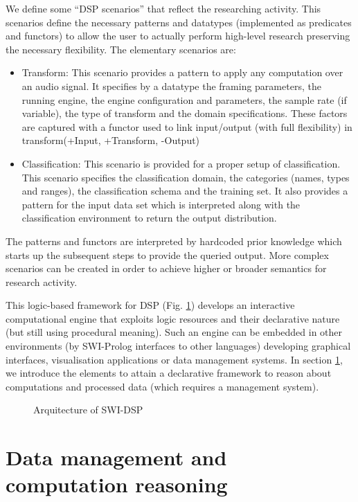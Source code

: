 \documentclass[runningheads]{llncs}
\begin{document}
We define some ``DSP scenarios'' that reflect the researching activity. This scenarios define the necessary patterns and datatypes (implemented as predicates and functors) to allow the user to actually perform high-level research preserving the necessary flexibility. The elementary scenarios are:

\begin{itemize}
 \item Transform: This scenario provides a pattern to apply any computation over an audio signal. It specifies by a datatype the framing parameters, the running engine, the engine configuration and parameters, the sample rate (if variable), the type of transform and the domain specifications. These factors are captured with a functor used to link input/output (with full flexibility) in transform(+Input, +Transform, -Output)
 \item Classification: This scenario is provided for a proper setup of classification. This scenario specifies the classification domain, the categories (names, types and ranges), the classification schema and the training set. It also provides a pattern for the input data set which is interpreted along with the classification environment to return the output distribution.
\end{itemize}

The patterns and functors are interpreted by hardcoded prior knowledge which starts up the subsequent steps to provide the queried output. More complex scenarios can be created in order to achieve higher or broader semantics for research activity.

This logic-based framework for DSP (Fig. \ref{fig:dspdrawing}) develops an interactive computational engine that exploits logic resources and their declarative nature (but still using procedural meaning). Such an engine can be embedded in other environments (by SWI-Prolog interfaces to other languages) developing graphical interfaces, visualisation applications or data management systems. In section \ref{sec:datamanage}, we introduce the elements to attain a declarative framework to reason about computations and processed data (which requires a management system).

\begin{figure}
\centerline{}
\caption{Arquitecture of SWI-DSP}
\label{fig:dspdrawing}
\end{figure}

\section{Data management and computation reasoning}\label{sec:datamanage}
\end{document}
